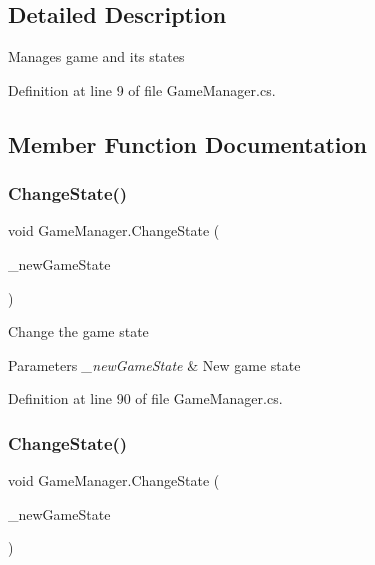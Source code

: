 \subsection{Detailed Description}
Manages game and its states 



Definition at line 9 of file Game\+Manager.\+cs.



\subsection{Member Function Documentation}
\mbox{\label{class_game_manager_a38cc549d56890d3d3097e0a81fd7428f}} 
\subsubsection{\texorpdfstring{Change\+State()}{ChangeState()}\hspace{0.1cm}{\footnotesize\ttfamily [1/2]}}
{\footnotesize\ttfamily void Game\+Manager.\+Change\+State (\begin{DoxyParamCaption}\item[{\mbox{\hyperlink{_game_manager_8cs_a7899b65f1ea0f655e4bbf8d2a5714285}{Game\+State}}}]{\+\_\+new\+Game\+State }\end{DoxyParamCaption})}



Change the game state 


\begin{DoxyParams}{Parameters}
{\em \+\_\+new\+Game\+State} & New game state\\
\hline
\end{DoxyParams}


Definition at line 90 of file Game\+Manager.\+cs.

\mbox{\label{class_game_manager_a1ba9d9459bb03a4046de5fc82734c612}} 
\subsubsection{\texorpdfstring{Change\+State()}{ChangeState()}\hspace{0.1cm}{\footnotesize\ttfamily [2/2]}}
{\footnotesize\ttfamily void Game\+Manager.\+Change\+State (\begin{DoxyParamCaption}\item[{int}]{\+\_\+new\+Game\+State }\end{DoxyParamCaption})}



